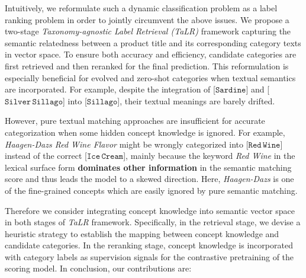 Intuitively, we reformulate such a dynamic classification problem as a label ranking problem in order to jointly circumvent the above issues.
We propose a two-stage \textit{Taxonomy-agnostic Label Retrieval (TaLR)} framework capturing the semantic relatedness between a product title and its corresponding category texts in vector space. 
To ensure both accuracy and efficiency, candidate categories are first retrieved and then reranked for the final prediction.
This reformulation is especially beneficial for evolved and zero-shot categories when textual semantics are incorporated. 
For example, despite the integration of [$\mathtt{Sardine}$] and [$\mathtt{Silver}\,\mathtt{Sillago}$] into [$\mathtt{Sillago}$], their textual meanings are barely drifted.

However, pure textual matching approaches are insufficient for accurate categorization when some hidden concept knowledge is ignored.
For example, \textit{Haagen-Dazs Red Wine Flavor} might be wrongly categorized into [$\mathtt{Red\,Wine}$] instead of the correct [$\mathtt{Ice\,Cream}$], mainly because the keyword \textit{Red Wine} in the lexical surface form 
\textbf{dominates other information} in the semantic matching score and thus 
leads the model to a skewed direction. Here, \textit{Haagen-Dazs} is one of the fine-grained concepts which are easily ignored by pure semantic matching.

Therefore we consider integrating concept knowledge into semantic vector space in both stages of \textit{TaLR} framework. 
Specifically, in the retrieval stage, we devise a heuristic strategy to establish the mapping between concept knowledge and candidate categories.
In the reranking stage, concept knowledge is incorporated with category labels as supervision signals for the contrastive pretraining of the scoring model.
In conclusion, our contributions are:

